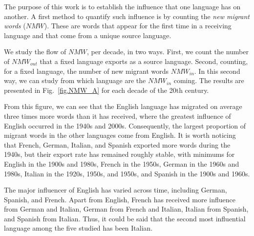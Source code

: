 \documentclass[10pt,letterpaper]{article} %
\newcommand{\Fref}[1]{Fig.~\ref{#1}}
\begin{document}
The purpose of this work is to establish the influence that one language has on
another. A first method to quantify such influence is by counting the
\textit{new migrant words} ($NMW$). These are words that appear for the first time in a
receiving language and that come from a unique source language.


We study the flow of $NMW$, per decade, in two ways. First, we
count the number of $NMW_{out}$ that a fixed language exports as a source
language. Second, counting, for a fixed language, the number
of new migrant words $NMW_{in}$. In this second way, we can study from 
which language are the $NMW_{in}$ coming.  The results are presented in 
\Fref{fig.NMW_A} for each decade of the 20th century. 

% 

From this figure, we can see that the English language has
migrated on average three times more words than it has received, where the
greatest influence of English occurred in the 1940s and 2000s.
Consequently, the largest proportion of migrant words in the other languages come
from English. It is worth noticing that French, German, Italian, and Spanish exported more words
during the 1940s, but their export rate has remained roughly stable, with minimums for English in the 1900s and 1980s, French in the 1950s, German in the 1960s and 1980s, Italian in the 1920s, 1950s, and 1950s, and Spanish in the 1900s and 1960s.

The major influencer of English has varied across time, including German, Spanish, and French. Apart from English, French has received more influence from German and Italian, German from French and Italian, Italian from Spanish, and Spanish from Italian. Thus, it could be said that the second most influential language among the five studied has been Italian. 
\end{document}

